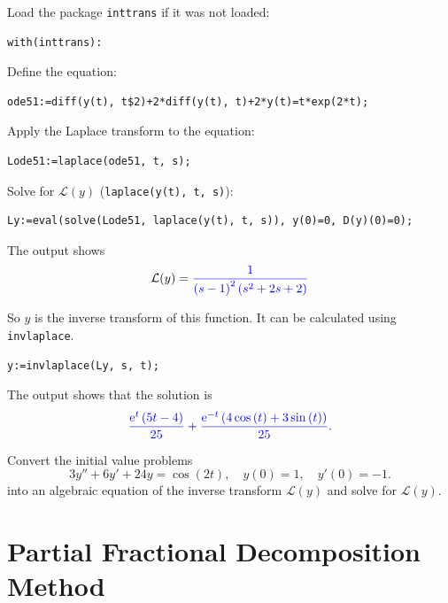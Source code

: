 \documentclass[
  12pt]{elegantbook}
\begin{document}
\begin{solution}
Load the package \texttt{inttrans} if it was not loaded:

\begin{verbatim}
with(inttrans):
\end{verbatim}

Define the equation:

\begin{verbatim}
ode51:=diff(y(t), t$2)+2*diff(y(t), t)+2*y(t)=t*exp(2*t);
\end{verbatim}

Apply the Laplace transform to the equation:

\begin{verbatim}
Lode51:=laplace(ode51, t, s);
\end{verbatim}

Solve for \(\mathcal{L}(y)\) (\texttt{laplace(y(t),\ t,\ s)}):

\begin{verbatim}
Ly:=eval(solve(Lode51, laplace(y(t), t, s)), y(0)=0, D(y)(0)=0);
\end{verbatim}

The output shows
\[\mathcal{L}(y)={\color{blue}{\frac{1}{\left(s -1\right)^{2} \left(s^{2}+2 s +2\right)}}}\]

So \(y\) is the inverse transform of this function. It can be calculated using \texttt{invlaplace}.

\begin{verbatim}
y:=invlaplace(Ly, s, t);
\end{verbatim}

The output shows that the solution is
\[{\color{blue}{\frac{{\mathrm e}^{t} \left(5 t -4\right)}{25}+\frac{{\mathrm e}^{-t} \left(4 \cos \left(t \right)+3 \sin \left(t \right)\right)}{25}}}.\]
\end{solution}

\begin{exercise}
Convert the initial value problems
\[3y''+6y'+24y=\cos(2t), \quad y(0)=1, \quad y'(0)=-1.\]
into an algebraic equation of the inverse transform \(\mathcal{L}(y)\) and solve for \(\mathcal{L}(y)\).
\end{exercise}

\hypertarget{partial-fractional-decomposition-method}{%
\section{Partial Fractional Decomposition Method}\label{partial-fractional-decomposition-method}}
\end{document}
